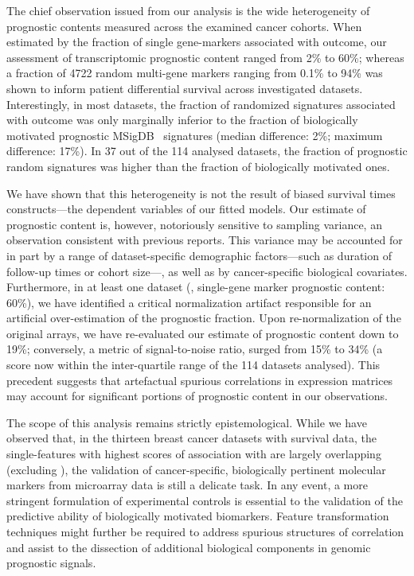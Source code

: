 The chief observation issued from our analysis is the wide heterogeneity of
prognostic contents measured across the examined cancer cohorts.  When estimated
by the fraction of single gene-markers associated with outcome, our assessment
of transcriptomic prognostic content ranged from 2\% to 60\%; whereas a fraction
of 4722 random multi-gene markers ranging from 0.1\% to 94\% was shown to
inform patient differential survival across investigated datasets.
Interestingly, in most datasets, the fraction of randomized signatures
associated with outcome was only marginally inferior to the fraction of
biologically motivated prognostic MSigDB~ signatures (median
difference: 2\%; maximum difference: 17\%).  In 37 out of the 114 analysed
datasets, the fraction of prognostic random signatures was higher than the
fraction of biologically motivated ones.

We have shown that this heterogeneity is not the result of biased survival times
constructs---the dependent variables of our fitted models.  Our estimate of
prognostic content is, however, notoriously sensitive to sampling variance, an
observation consistent with previous reports.\cite{ein-dor_outcome_2005} This
variance may be accounted for in part by a range of dataset-specific demographic
factors---such as duration of follow-up times or cohort size---, as well as by
cancer-specific biological covariates.  Furthermore, in at least one dataset
(, single-gene marker prognostic content: 60\%), we have
identified a critical normalization artifact responsible for an artificial
over-estimation of the prognostic fraction.  Upon re-normalization of the
original arrays, we have re-evaluated our estimate of prognostic content down to
19\%; conversely, a metric of signal-to-noise ratio,\cite{venet_measure_2012}
surged from 15\% to 34\% (a score now within the inter-quartile range of the 114
datasets analysed).  This precedent suggests that artefactual spurious
correlations in expression matrices may account for significant portions of
prognostic content in our observations.

The scope of this analysis remains strictly epistemological.  While we have
observed that, in the thirteen breast cancer datasets with 
survival data, the single-features with highest scores of association with
 are largely overlapping (excluding ), the
validation of cancer-specific, biologically pertinent molecular markers from
microarray data is still a delicate task.  In any event, a more stringent
formulation of experimental controls is essential to the validation of the
predictive ability of biologically motivated
biomarkers.\cite{beck_significance_2013} Feature transformation techniques might
further be required to address spurious structures of correlation and assist to
the dissection of additional biological components in genomic prognostic
signals.

